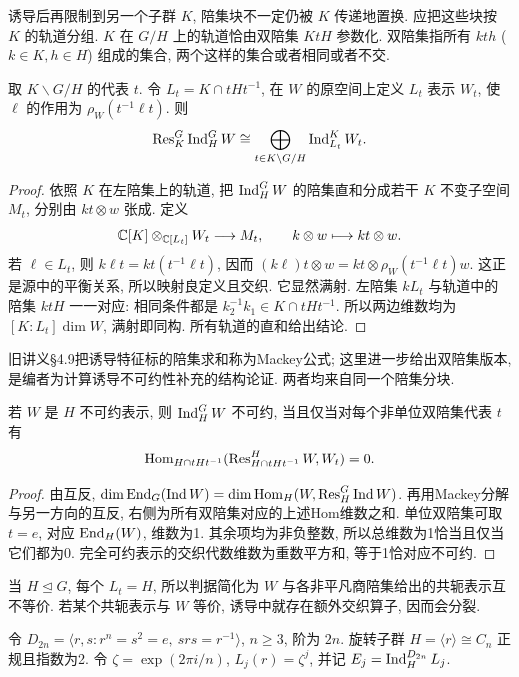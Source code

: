 诱导后再限制到另一个子群 $K$, 陪集块不一定仍被 $K$ 传递地置换. 应把这些块按 $K$ 的轨道分组. $K$ 在 $G/H$ 上的轨道恰由双陪集 $KtH$ 参数化. 双陪集指所有 $kth$ ($k\in K,h\in H$) 组成的集合, 两个这样的集合或者相同或者不交.

\begin{theorem}[Mackey分解]\label{thm:mackey}
取 $K\backslash G/H$ 的代表 $t$. 令 $L_t=K\cap tHt^{-1}$, 在 $W$ 的原空间上定义 $L_t$ 表示 $W_t$, 使 $\ell$ 的作用为 $\rho_W(t^{-1}\ell t)$. 则
\[
 \operatorname{Res}_K^G\operatorname{Ind}_H^G W\cong
 \bigoplus_{t\in K\backslash G/H}\operatorname{Ind}_{L_t}^K W_t.
\]
\end{theorem}
\begin{proof}
依照 $K$ 在左陪集上的轨道, 把 $\operatorname{Ind}_H^G W$ 的陪集直和分成若干 $K$ 不变子空间 $M_t$, 分别由 $kt\otimes w$ 张成. 定义
\[
 \mathbb C[K]\otimes_{\mathbb C[L_t]} W_t\longrightarrow M_t,\qquad
 k\otimes w\longmapsto kt\otimes w.
\]
若 $\ell\in L_t$, 则 $k\ell t=kt(t^{-1}\ell t)$, 因而 $(k\ell)t\otimes w=kt\otimes\rho_W(t^{-1}\ell t)w$. 这正是源中的平衡关系, 所以映射良定义且交织. 它显然满射. 左陪集 $kL_t$ 与轨道中的陪集 $ktH$ 一一对应: 相同条件都是 $k_2^{-1}k_1\in K\cap tHt^{-1}$. 所以两边维数均为 $[K:L_t]\dim W$, 满射即同构. 所有轨道的直和给出结论.
\end{proof}
旧讲义§4.9把诱导特征标的陪集求和称为Mackey公式; 这里进一步给出双陪集版本, 是编者为计算诱导不可约性补充的结构论证. 两者均来自同一个陪集分块.

\begin{corollary}\label{cor:mackeycriterion}
若 $W$ 是 $H$ 不可约表示, 则 $\operatorname{Ind}_H^G W$ 不可约, 当且仅当对每个非单位双陪集代表 $t$ 有
\[
 \operatorname{Hom}_{H\cap tHt^{-1}}(\operatorname{Res}_{H\cap tHt^{-1}}^H W,W_t)=0.
\]
\end{corollary}
\begin{proof}
由互反,
$\dim\operatorname{End}_G(\operatorname{Ind} W)=\dim\operatorname{Hom}_H(W,\operatorname{Res}_H^G\operatorname{Ind} W)$. 再用Mackey分解与另一方向的互反, 右侧为所有双陪集对应的上述Hom维数之和. 单位双陪集可取 $t=e$, 对应 $\operatorname{End}_H(W)$, 维数为1. 其余项均为非负整数, 所以总维数为1恰当且仅当它们都为0. 完全可约表示的交织代数维数为重数平方和, 等于1恰对应不可约.
\end{proof}
当 $H\trianglelefteq G$, 每个 $L_t=H$, 所以判据简化为 $W$ 与各非平凡商陪集给出的共轭表示互不等价. 若某个共轭表示与 $W$ 等价, 诱导中就存在额外交织算子, 因而会分裂.

令 $D_{2n}=\langle r,s:r^n=s^2=e,\ srs=r^{-1}\rangle$, $n\ge3$, 阶为 $2n$. 旋转子群 $H=\langle r\rangle\cong C_n$ 正规且指数为2. 令 $\zeta=\exp(2\pi i/n)$, $L_j(r)=\zeta^j$, 并记 $E_j=\operatorname{Ind}_H^{D_{2n}}L_j$.

